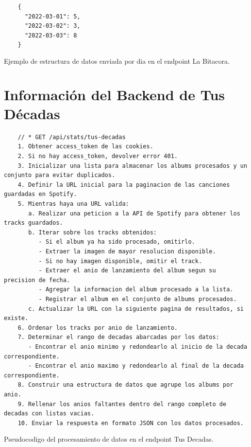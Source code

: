 \begin{ifalgorithm}[H]
  \begin{lstlisting}
    {
      "2022-03-01": 5,
      "2022-03-02": 3,
      "2022-03-03": 8
    }
    \end{lstlisting}
  \caption{Ejemplo de estructura de datos enviada por dia en el endpoint La Bitacora.}
  \label{alg:la_bitacora_response_day}
\end{ifalgorithm}

\section{Información del Backend de Tus Décadas} \label{sec:backend_tus_decadas}

\begin{ifalgorithm}[H]
  \begin{lstlisting}
    // * GET /api/stats/tus-decadas
    1. Obtener access_token de las cookies.
    2. Si no hay access_token, devolver error 401.
    3. Inicializar una lista para almacenar los albums procesados y un conjunto para evitar duplicados.
    4. Definir la URL inicial para la paginacion de las canciones guardadas en Spotify.
    5. Mientras haya una URL valida:
       a. Realizar una peticion a la API de Spotify para obtener los tracks guardados.
       b. Iterar sobre los tracks obtenidos:
          - Si el album ya ha sido procesado, omitirlo.
          - Extraer la imagen de mayor resolucion disponible.
          - Si no hay imagen disponible, omitir el track.
          - Extraer el anio de lanzamiento del album segun su precision de fecha.
          - Agregar la informacion del album procesado a la lista.
          - Registrar el album en el conjunto de albums procesados.
       c. Actualizar la URL con la siguiente pagina de resultados, si existe.
    6. Ordenar los tracks por anio de lanzamiento.
    7. Determinar el rango de decadas abarcadas por los datos:
       - Encontrar el anio minimo y redondearlo al inicio de la decada correspondiente.
       - Encontrar el anio maximo y redondearlo al final de la decada correspondiente.
    8. Construir una estructura de datos que agrupe los albums por anio.
    9. Rellenar los anios faltantes dentro del rango completo de decadas con listas vacias.
    10. Enviar la respuesta en formato JSON con los datos procesados.
    \end{lstlisting}
  \caption{Pseudocodigo del procesamiento de datos en el endpoint Tus Decadas.}
  \label{alg:tus_decadas}
\end{ifalgorithm}

